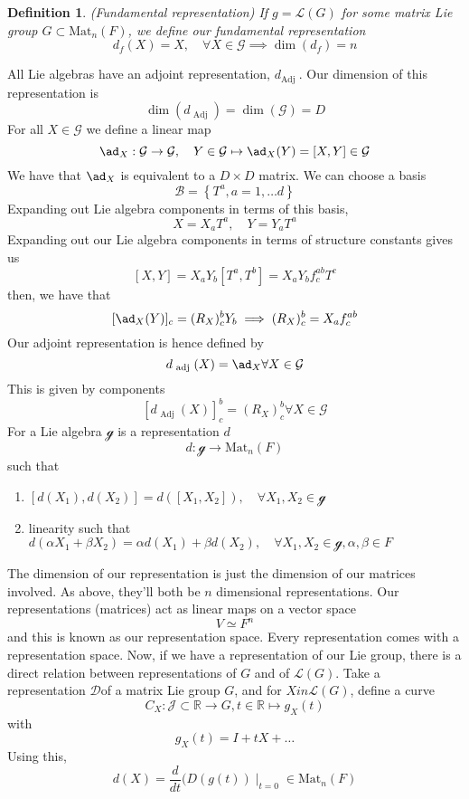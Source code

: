 \documentclass[11pt, oneside]{article}   	%
\theoremstyle{slanted}
\newtheorem*{defn}{Definition}
\newcommand{\lalg}{ \mathcal{ G } }
\begin{document}
\begin{defn}{(Fundamental representation)}
	If $ g   = \mathcal{ L } ( G ) $ for some
	matrix Lie group $ G \subset \text{Mat}_n ( F) $, we define our 
	fundamental representation 
	\[
	 d _ f ( X) = X, \quad \forall X \in \lalg \implies \dim ( d_ f ) = n 
	\] 
\end{defn}

All Lie algebras have an adjoint representation, $ d_{ \text{Adj }}$. 
Our dimension of this representation is 
\[
	\dim ( d_{ \text{ Adj } } ) = \dim ( \lalg )  = D
\]  For all $ X \in \lalg  $ we define a linear map 
\[
	\ad_X : \lalg \to \lalg, \quad Y \in \lalg \mapsto \ad_ X( Y ) = [ X, Y ] \in \lalg
\] We have that $ \ad_ X$ is equivalent to a $ D \times D $ matrix. 
We can choose a basis 
\[
 \mathcal{ B } = \left\{  T ^ a , a = 1 , \dots d  \right\} 
\] Expanding out Lie algebra components 
in terms of this basis, 
\[
 X = X_ a T ^ a , \quad Y = Y _ a T ^ a 
\] Expanding out our Lie algebra components 
in terms of structure constants 
gives us 
\[
 [ X, Y ] = X_ a Y _ b [ T ^ a, T ^ b ] = X_ a Y _ b f ^{ ab } _ c T ^ c 
\] then, we have that 
\[
 [ \ad _ X ( Y ) ] _ c  = ( R_ X ) ^ b _ c Y _ b \implies ( R_ X ) ^ b _ c = X_ a f ^{ ab } _ c 
\] Our adjoint representation 
is hence defined by 
\[
	d_{ \text{ adj } } ( X) = \ad _ X \forall X \in \lalg
\] This is given by components 
\[
	[ d_{ \text{ Adj } } ( X) ] ^ b _ c = ( R_ X ) ^ b _ c \forall X \in \lalg 
\] 
For a Lie algebra $  \mathcal{ g}$ is a representation $ d $ 
 \[
	 d : \mathcal{ g  } \to \text{Mat}_n ( F )
\]  such that 
\begin{enumerate}
	\item $ [ d( X_1 ) , d ( X_2 ) ] = d ( [ X_1 , X_2 ] ) , \quad \forall X_1, X_2 \in \mathcal{ g }$ 
	\item linearity such that $ d ( \alpha X_1 + \beta X_ 2 ) = \alpha d ( X_1 ) + \beta d ( X_2 ) , \quad \forall X_1, X_2 \in \mathcal{ g } , \alpha , \beta \in F $
\end{enumerate}
The dimension of our representation is just the 
dimension of our matrices involved. 
As above, they'll both be $ n $ dimensional representations.
Our representations (matrices) act as linear maps on a vector space 
\[
 V \simeq F^ n 
\]  and this is known as our representation space. 
Every representation comes with a representation space. 
Now, if we have a representation of our Lie group, 
there is a direct relation between representations of $ G $ and of 
$ \mathcal{ L } ( G ) $. Take a representation $ \mathcal{ D } $of a
matrix Lie group $ G $, and for  $ X in \mathcal{ L } ( G ) $, define a curve
\[
	C_ X : \mathcal{ J } \subset \mathbb{ R} \to G, t \in \mathbb{ R} \mapsto g_X ( t) 
\] with 
\[
 g_X ( t) = I + t X + \dots 
\] Using this, 
\[
	d ( X) = \frac{d }{ dt } ( D ( g ( t ) ) \mid_{ t = 0 } \in \text{Mat}_n ( F) 
\] 
\end{document}
